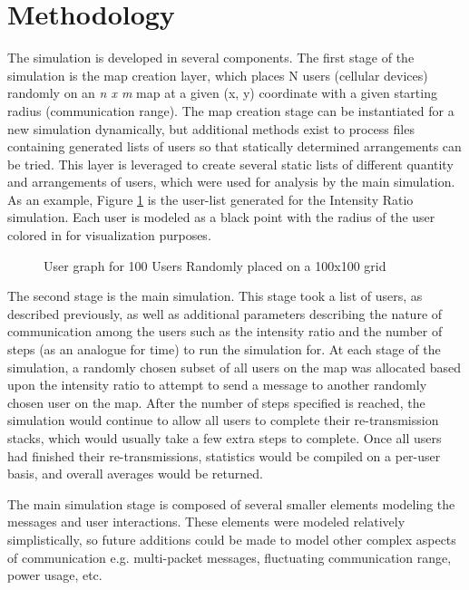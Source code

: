 \section{Methodology}
The simulation is developed in several components.
The first stage of the simulation is the map creation layer,
which places N users (cellular devices) randomly on an \textit{n x m} map at a
given (x, y) coordinate with a given starting radius (communication range).
The map creation stage can be instantiated for a new simulation dynamically, 
but additional methods exist to process files containing generated lists of 
users so that statically determined arrangements can be tried.
This layer is leveraged to create several static lists of different quantity
and arrangements of users, which were used for analysis by the main simulation.
As an example, Figure \ref{fig:usergraph} is the user-list
generated for the Intensity Ratio simulation.
Each user is modeled as a black point with the radius of the user colored in
for visualization purposes.
\par
\begin{figure}[!htb]
\begin{centering}
    
    \caption{User graph for 100 Users Randomly placed on a 100x100 grid}
    \label{fig:usergraph}
\end{centering}
\end{figure}
\par

The second stage is the main simulation.
This stage took a list of users, as described previously, as well as additional
parameters describing the nature of communication among the users such as
the intensity ratio and the number of steps (as an analogue for time) to run 
the simulation for.
At each stage of the simulation, a randomly chosen subset of all users on the map
was allocated based upon the intensity ratio to attempt to send a message to another
randomly chosen user on the map.
After the number of steps specified is reached, the simulation would continue
to allow all users to complete their re-transmission stacks, which would usually
take a few extra steps to complete.
Once all users had finished their re-transmissions, statistics would be compiled
on a per-user basis, and overall averages would be returned.

The main simulation stage is composed of several smaller elements modeling
the messages and user interactions.
These elements were modeled relatively simplistically, so future additions could be
made to model other complex aspects of communication e.g. multi-packet messages,
fluctuating communication range, power usage, etc.

